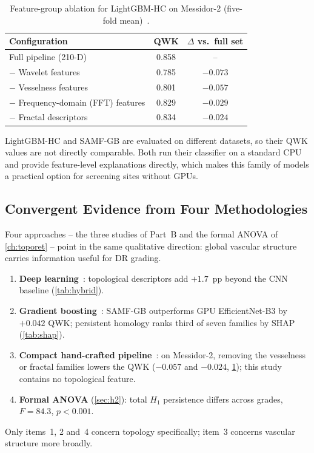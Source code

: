\begin{table}[H]
\centering
\caption[Feature-group ablation for LightGBM-HC]{Feature-group ablation for LightGBM-HC on
Messidor-2 (five-fold mean)~\cite{belhadj2026icpram}.}
\label{tab:lgbm-abl}
\small
\begin{tabular}{@{}lcc@{}}
\toprule
Configuration & QWK & $\Delta$ vs.\ full set \\
\midrule
Full pipeline (210-D) & 0.858 & -- \\
$-$ Wavelet features & 0.785 & $-0.073$ \\
$-$ Vesselness features & 0.801 & $-0.057$ \\
$-$ Frequency-domain (FFT) features & 0.829 & $-0.029$ \\
$-$ Fractal descriptors & 0.834 & $-0.024$ \\
\bottomrule
\end{tabular}
\end{table}

LightGBM-HC and SAMF-GB are evaluated on different datasets, so their QWK values are not
directly comparable. Both run their classifier on a standard CPU and provide feature-level
explanations directly, which makes this family of models a practical option for screening
sites without GPUs.

\subsection{Convergent Evidence from Four Methodologies}
\label{sec:converge}

Four approaches -- the three studies of Part~B and the formal ANOVA of
\cref{ch:toporet} -- point in the same qualitative direction: global vascular structure
carries information useful for DR grading.
\begin{enumerate}
\item \textbf{Deep learning}~\cite{belhadj2026hybrid,mezghich2026lnaitopo}: topological
descriptors add $+1.7$~pp beyond the CNN baseline (\cref{tab:hybrid}).
\item \textbf{Gradient boosting}~\cite{belhadj2026samfgb}: SAMF-GB outperforms GPU
EfficientNet-B3 by $+0.042$ QWK; persistent homology ranks third of seven families by SHAP
(\cref{tab:shap}).
\item \textbf{Compact hand-crafted pipeline}~\cite{belhadj2026icpram}: on Messidor-2,
removing the vesselness or fractal families lowers the QWK ($-0.057$ and $-0.024$,
\cref{tab:lgbm-abl}); this study contains no topological feature.
\item \textbf{Formal ANOVA} (\cref{sec:h2}): total $H_1$ persistence differs across grades,
$F=84.3$, $p<0.001$.
\end{enumerate}
Only items~1, 2 and~4 concern topology specifically; item~3 concerns vascular structure
more broadly.

